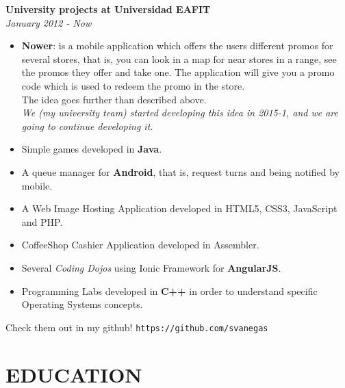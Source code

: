 \documentclass[margin, 10pt]{res} %
\begin{document}
\begin{resume}
\textbf{University projects at Universidad EAFIT} \\
\textit{January 2012 - Now} \\
\begin{itemize}
  \item \textbf{Nower}: is a mobile application which offers the users different promos for several
        stores, that is, you can look in a map for near stores in a range, see the promos they offer
        and take one. The application will give you a promo code which is used to redeem the promo
        in the store.\\
        The idea goes further than described above.\\
        \emph{We (my university team) started developing this idea in 2015-1, and we are going to
              continue developing it.}\\
  \item Simple games developed in \textbf{Java}.
  \item A queue manager for \textbf{Android}, that is, request turns and being notified by mobile.
  \item A Web Image Hosting Application developed in HTML5, CSS3, JavaScript and PHP.
  \item CoffeeShop Cashier Application developed in Assembler.
  \item Several \textit{Coding Dojos} using Ionic Framework for \textbf{AngularJS}.
  \item Programming Labs developed in \textbf{C++} in order to understand specific Operating Systems
        concepts.
\end{itemize}
Check them out in my github! \texttt{https://github.com/svanegas}


\section{EDUCATION}


\end{resume}
\end{document}
